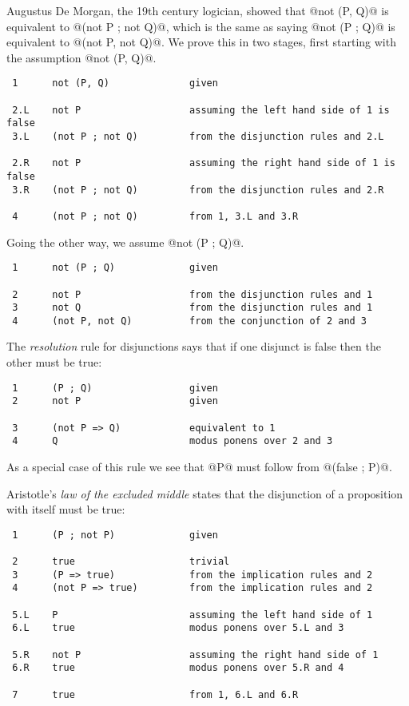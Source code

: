 Augustus De Morgan, the 19th century logician, showed that @not (P, Q)@
is equivalent to @(not P ; not Q)@, which is the same as saying
@not (P ; Q)@ is equivalent to @(not P, not Q)@.  We prove this in two
stages, first starting with the assumption @not (P, Q)@.
\begin{verbatim}
 1      not (P, Q)              given

 2.L    not P                   assuming the left hand side of 1 is false
 3.L    (not P ; not Q)         from the disjunction rules and 2.L

 2.R    not P                   assuming the right hand side of 1 is false
 3.R    (not P ; not Q)         from the disjunction rules and 2.R

 4      (not P ; not Q)         from 1, 3.L and 3.R
\end{verbatim}
Going the other way, we assume @not (P ; Q)@.
\begin{verbatim}
 1      not (P ; Q)             given

 2      not P                   from the disjunction rules and 1
 3      not Q                   from the disjunction rules and 1
 4      (not P, not Q)          from the conjunction of 2 and 3
\end{verbatim}

The \emph{resolution} rule for disjunctions says that if one disjunct is
false then the other must be true:
\begin{verbatim}
 1      (P ; Q)                 given
 2      not P                   given

 3      (not P => Q)            equivalent to 1
 4      Q                       modus ponens over 2 and 3
\end{verbatim}
As a special case of this rule we see that @P@ must follow from
@(false ; P)@.

Aristotle's \emph{law of the excluded middle} states that the
disjunction of a proposition with itself must be true:
\begin{verbatim}
 1      (P ; not P)             given

 2      true                    trivial
 3      (P => true)             from the implication rules and 2
 4      (not P => true)         from the implication rules and 2

 5.L    P                       assuming the left hand side of 1
 6.L    true                    modus ponens over 5.L and 3

 5.R    not P                   assuming the right hand side of 1
 6.R    true                    modus ponens over 5.R and 4

 7      true                    from 1, 6.L and 6.R
\end{verbatim}

